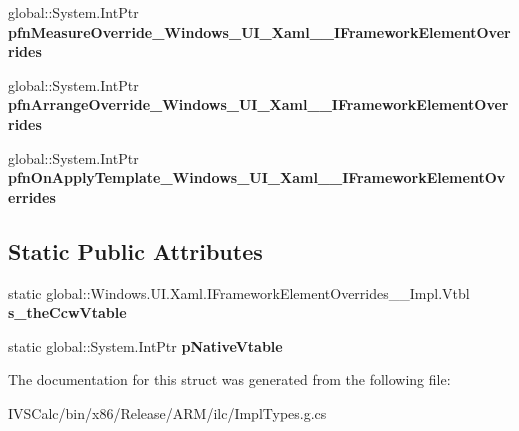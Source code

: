 \begin{DoxyCompactItemize}
global\+::\+System.\+Int\+Ptr {\bfseries pfn\+Measure\+Override\+\_\+\+Windows\+\_\+\+U\+I\+\_\+\+Xaml\+\_\+\+\_\+\+I\+Framework\+Element\+Overrides}
\item 
\mbox{\label{struct_windows_1_1_u_i_1_1_xaml_1_1_i_framework_element_overrides_____impl_1_1_vtbl_ad69d1a5ea56113c8cd514a75e9a94dd6}} 
global\+::\+System.\+Int\+Ptr {\bfseries pfn\+Arrange\+Override\+\_\+\+Windows\+\_\+\+U\+I\+\_\+\+Xaml\+\_\+\+\_\+\+I\+Framework\+Element\+Overrides}
\item 
\mbox{\label{struct_windows_1_1_u_i_1_1_xaml_1_1_i_framework_element_overrides_____impl_1_1_vtbl_ad28677b8ce26f659b8a66e9200304584}} 
global\+::\+System.\+Int\+Ptr {\bfseries pfn\+On\+Apply\+Template\+\_\+\+Windows\+\_\+\+U\+I\+\_\+\+Xaml\+\_\+\+\_\+\+I\+Framework\+Element\+Overrides}
\end{DoxyCompactItemize}
\subsection*{Static Public Attributes}
\begin{DoxyCompactItemize}
\item 
\mbox{\label{struct_windows_1_1_u_i_1_1_xaml_1_1_i_framework_element_overrides_____impl_1_1_vtbl_a0a9a79313af9cc80ac47b8dbe0acc837}} 
static global\+::\+Windows.\+U\+I.\+Xaml.\+I\+Framework\+Element\+Overrides\+\_\+\+\_\+\+Impl.\+Vtbl {\bfseries s\+\_\+the\+Ccw\+Vtable}
\item 
\mbox{\label{struct_windows_1_1_u_i_1_1_xaml_1_1_i_framework_element_overrides_____impl_1_1_vtbl_a476594c2260b8c47b6ffb586db55ff4e}} 
static global\+::\+System.\+Int\+Ptr {\bfseries p\+Native\+Vtable}
\end{DoxyCompactItemize}


The documentation for this struct was generated from the following file\+:\begin{DoxyCompactItemize}
\item 
I\+V\+S\+Calc/bin/x86/\+Release/\+A\+R\+M/ilc/Impl\+Types.\+g.\+cs\end{DoxyCompactItemize}
